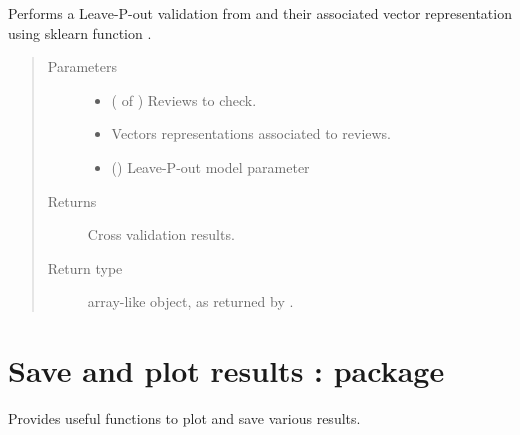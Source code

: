 \documentclass[letterpaper,10pt,english]{sphinxmanual}
\begin{document}
\begin{fulllineitems}
\label{\detokenize{learning:loacore.learning.validation.leave_p_out_validation}}
Performs a Leave-P-out validation from  and their associated vector representation using sklearn function
.
\begin{quote}\begin{description}
\item[{Parameters}] \leavevmode\begin{itemize}
\item {} 
 ( of {\hyperref[\detokenize{classes:loacore.classes.classes.Review}]{}}) \textendash{} Reviews to check.

\item {} 
 \textendash{} Vectors representations associated to reviews.

\item {} 
 () \textendash{} Leave-P-out model parameter

\end{itemize}

\item[{Returns}] \leavevmode
Cross validation results.

\item[{Return type}] \leavevmode

array-like object, as returned by .


\end{description}\end{quote}

\end{fulllineitems}



\chapter{Save and plot results :  package}
\label{\detokenize{utils:save-and-plot-results-utils-package}}\label{\detokenize{utils::doc}}
Provides useful functions to plot and save various results.
\end{document}
